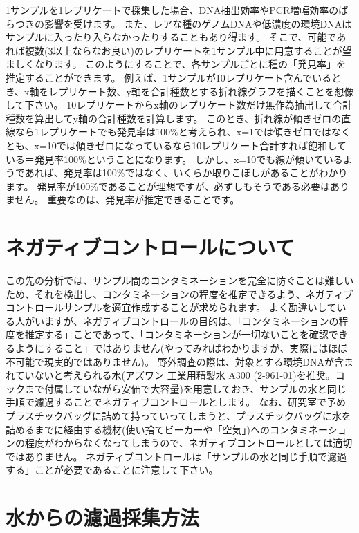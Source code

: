 \documentclass[titlepage,10pt,a4paper,uplatex]{jsbook}
\begin{document}
1サンプルを1レプリケートで採集した場合、DNA抽出効率やPCR増幅効率のばらつきの影響を受けます。
また、レアな種のゲノムDNAや低濃度の環境DNAはサンプルに入ったり入らなかったりすることもあり得ます。
そこで、可能であれば複数(3以上ならなお良い)のレプリケートを1サンプル中に用意することが望ましくなります。
このようにすることで、各サンプルごとに種の「発見率」を推定することができます。
例えば、1サンプルが10レプリケート含んでいるとき、x軸をレプリケート数、y軸を合計種数とする折れ線グラフを描くことを想像して下さい。
10レプリケートからx軸のレプリケート数だけ無作為抽出して合計種数を算出してy軸の合計種数を計算します。
このとき、折れ線が傾きゼロの直線なら1レプリケートでも発見率は100\%と考えられ、x=1では傾きゼロではなくとも、x=10では傾きゼロになっているなら10レプリケート合計すれば飽和している＝発見率100\%ということになります。
しかし、x=10でも線が傾いているようであれば、発見率は100\%ではなく、いくらか取りこぼしがあることがわかります。
発見率が100\%であることが理想ですが、必ずしもそうである必要はありません。
重要なのは、発見率が推定できることです。

\section{ネガティブコントロールについて}

この先の分析では、サンプル間のコンタミネーションを完全に防ぐことは難しいため、それを検出し、コンタミネーションの程度を推定できるよう、ネガティブコントロールサンプルを適宜作成することが求められます。
よく勘違いしている人がいますが、ネガティブコントロールの目的は、「コンタミネーションの程度を推定する」ことであって、「コンタミネーションが一切ないことを確認できるようにすること」ではありません(やってみればわかりますが、実際にはほぼ不可能で現実的ではありません)。
野外調査の際は、対象とする環境DNAが含まれていないと考えられる水(アズワン 工業用精製水 A300 (2-961-01)を推奨。コックまで付属していながら安価で大容量)を用意しておき、サンプルの水と同じ手順で濾過することでネガティブコントロールとします。
なお、研究室で予めプラスチックバッグに詰めて持っていってしまうと、プラスチックバッグに水を詰めるまでに経由する機材(使い捨てビーカーや「空気」)へのコンタミネーションの程度がわからなくなってしまうので、ネガティブコントロールとしては適切ではありません。
ネガティブコントロールは「サンプルの水と同じ手順で濾過する」ことが必要であることに注意して下さい。

\section{水からの濾過採集方法}
\end{document}
